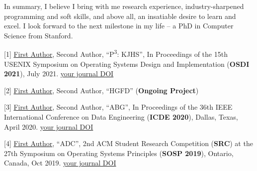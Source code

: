 \documentclass{article}
\newcommand{\school}{Stanford\xspace}
\begin{document}

In summary, I believe I bring with me research experience, industry-sharpened programming and soft skills, and above all, an insatiable desire to learn and excel. I look forward to the next milestone in my life -- a PhD in Computer Science from \school. 

\vspace{0.125in}



[1] \underline{First Author}, Second Author, ``P\textsuperscript{3}: KJHS'', In Proceedings of the 15th USENIX Symposium on Operating Systems Design and Implementation (\textbf{OSDI 2021}), July 2021. \url{your journal DOI}

[2] \underline{First Author}, Second Author, ``HGFD'' (\textbf{Ongoing Project})

[3] \underline{First Author}, Second Author, ``ABG'', In Proceedings of the 36th IEEE International Conference on Data Engineering (\textbf{ICDE 2020}), Dallas, Texas, April 2020. \url{your journal DOI}

[4] \underline{First Author}, ``ADC'', 2nd ACM Student Research Competition (\textbf{SRC}) at the 27th Symposium on Operating Systems Principles (\textbf{SOSP 2019}), Ontario, Canada, Oct 2019. \url{your journal DOI}
\end{document}
